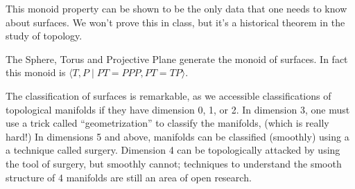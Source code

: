This monoid property can be shown to be \label{proj:classification} the only data that one needs to know about surfaces. We won't prove this in class, but it's a historical theorem in the study of topology. \project
\begin{theorem}
 The Sphere, Torus and Projective Plane generate the monoid of surfaces. In fact this monoid is $\langle T, P \;|\; PT=PPP, PT=TP\rangle. $
\end{theorem}
The classification of surfaces is remarkable, as we accessible  classifications of topological manifolds if they have dimension 0, 1, or 2.  In dimension 3, one must use a trick called ``geometrization'' to classify the manifolds, (which is really hard!) In dimensions 5 and above, manifolds can be classified (smoothly) using a a technique called surgery. Dimension 4 can be topologically attacked by using the tool of surgery, but smoothly cannot; techniques to understand the smooth structure of 4 manifolds are still an area of open research. 

